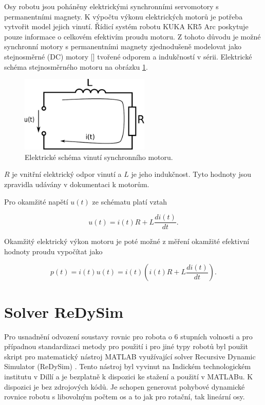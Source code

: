 Osy robotu jsou poháněny elektrickými synchronními servomotory s permanentními magnety. K výpočtu výkonu elektrických motorů je potřeba vytvořit model jejich vinutí. Řídicí systém robotu KUKA KR5 Arc poskytuje pouze informace o celkovém efektivím proudu motoru. Z tohoto důvodu je možné synchronní motory s permanentními magnety zjednodušeně modelovat jako stejnosměrné (DC) motory [\cite{sbornik}] tvořené odporem a indukčností v sérii. Elektrické schéma stejnosměrného motoru na obrázku \ref{schema_motoru_pic}.  

\begin{figure}[ht]
\includegraphics[width=0.55\textwidth]{obvod_motoru}
\caption{Elektrické schéma vinutí synchronního motoru.}
\label{schema_motoru_pic}
\end{figure}

$R$ je vnitřní elektrický odpor vinutí a $L$ je jeho indukčnost. Tyto hodnoty jsou zpravidla udávány v dokumentaci k motorům.

Pro okamžité napětí $u(t)$ ze schématu platí vztah

\begin{equation}
u(t) = i(t)R + L\frac{di(t)}{dt}.
\label{motor_voltage_eq}
\end{equation}  

Okamžitý elektrický výkon motoru je poté možné z měření okamžité efektivní hodnoty proudu vypočítat jako
 
\begin{equation}
p(t) = i(t)u(t) = i(t)\left(i(t)R + L\frac{di(t)}{dt}\right).
\label{motor_power_eq}
\end{equation} 

\newpage
\section{Solver ReDySim}

Pro usnadnění odvození soustavy rovnic pro robota o 6 stupních volnosti a pro případnou standardizaci metody pro použití i pro jiné typy robotů byl použit skript pro matematický nástroj MATLAB využívající solver Recursive Dynamic Simulator (ReDySim) \cite{redysim}. Tento nástroj byl vyvinut na Indickém technologickém institutu v Dillí a je bezplatně k dispozici ke stažení a použití v MATLABu. K dispozici je bez zdrojových kódů. Je schopen generovat pohybové dynamické rovnice robotu s libovolným počtem os a to jak pro rotační, tak lineární osy. 

